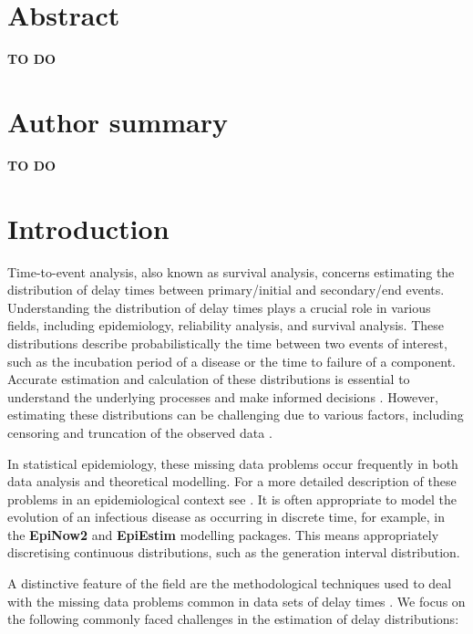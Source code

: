 \documentclass[10pt,letterpaper]{article}
\begin{document}
\section*{Abstract}
\textbf{TO DO}



\section*{Author summary}
\textbf{TO DO}

\linenumbers

\section*{Introduction}

Time-to-event analysis, also known as survival analysis, concerns estimating the distribution of delay times between primary/initial and secondary/end events. Understanding the distribution of delay times plays a crucial role in various fields, including epidemiology, reliability analysis, and survival analysis. These distributions describe probabilistically the time between two events of interest, such as the incubation period of a disease or the time to failure of a component. Accurate estimation and calculation of these distributions is essential to understand the underlying processes and make informed decisions \cite{charniga2024best}. However, estimating these distributions can be challenging due to various factors, including censoring and truncation of the observed data \cite{Park2024.01.12.24301247}.

In statistical epidemiology, these missing data problems occur frequently in both data analysis and theoretical modelling. For a more detailed description of these problems in an epidemiological context see \cite{Park2024.01.12.24301247, charniga2024best}. It is often appropriate to model the evolution of an infectious disease as occurring in discrete time, for example, in the \textbf{EpiNow2}\cite{abbottepinow2} and \textbf{EpiEstim}\cite{Cori2013} modelling packages. This means appropriately discretising continuous distributions, such as the generation interval distribution.

A distinctive feature of the field are the methodological techniques used to deal with the missing data problems common in data sets of delay times \cite{leung1997censoring}. We focus on the following commonly faced challenges in the estimation of delay distributions:
\end{document}
